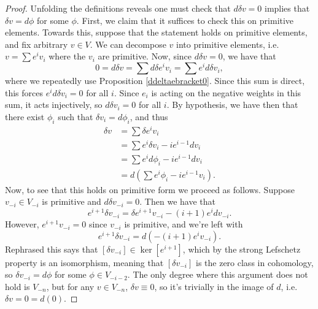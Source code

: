 \documentclass{amsart}
\theoremstyle{definition}
\begin{document}
\begin{proof}
    Unfolding the definitions reveals one must check that $d \delta v=0$ implies that $\delta v = d \phi$ for some $\phi$. First, we claim that it suffices to check this on primitive elements. Towards this, suppose that the statement holds on primitive elements, and fix arbitrary $v \in V$. We can decompose $v$ into primitive elements, i.e. $v =\sum e^i v_i$ where the $v_i$ are primitive. Now, since $d \delta v=0$, we have that
    \begin{equation*}
        0 = d \delta v = \sum d \delta e^i v_i  = \sum e^i d \delta v_i,
    \end{equation*}
    where we repeatedly use Proposition \ref{ddeltaebracket0}. Since this sum is direct, this forces $e^i d \delta v_i=0$ for all $i$. Since $e_i$ is acting on the negative weights in this sum, it acts injectively, so $d \delta v_i=0$ for all $i$. By hypothesis, we have then that there exist $\phi_i$ such that $\delta v_i = d \phi_i$, and thus
    \begin{align*}
        \delta v &= \sum \delta e^iv_i  \\
        &= \sum e^i \delta v_i - ie^{i-1}dv_i \\
        &= \sum e^i d \phi_i - i e^{i-1}dv_i \\
        &= d\left( \sum e^i \phi_i  - ie^{i-1}v_i\right).
    \end{align*}
    Now, to see that this holds on primitive form we proceed as follows. Suppose $v_{-i} \in V_{-i}$ is primitive and $d \delta v_{-i} =0$. Then we have that 
    \begin{equation*}
        e^{i+1}\delta v_{-i} = \delta e^{i+1}v_{-i} - (i+1)e^{i}dv_{-i}.
    \end{equation*}
    However, $e^{i+1}v_{-i}=0$ since $v_{-i}$ is primitive, and we're left with
    \begin{equation*}
        e^{i+1}\delta v_{-i} = d(-(i+1)e^iv_{-i}).
    \end{equation*}
    Rephrased this says that $[\delta v_{-i}] \in \ker [e^{i+1}]$, which by the strong Lefschetz property is an isomorphism, meaning that $[\delta v_{-i}]$ is the zero class in cohomology, so $\delta v_{-i}=d\phi$ for some $\phi \in V_{-i-2}$. The only degree where this argument does not hold is $V_{-n}$, but for any $v \in V_{-n}$, $\delta v \equiv 0$, so it's trivially in the image of $d$, i.e. $\delta v =0 = d(0)$.
\end{proof}
\end{document}
